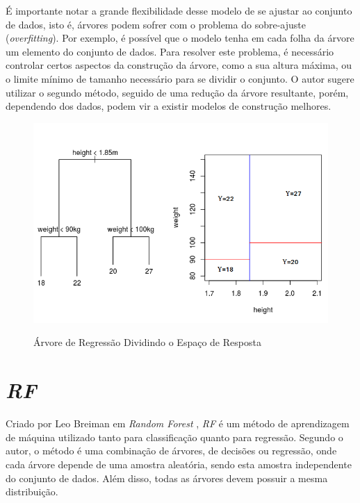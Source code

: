 É importante notar a grande flexibilidade desse modelo de se ajustar ao conjunto de dados, isto é, árvores podem sofrer com o problema do sobre-ajuste (\textit{overfitting}). Por exemplo, é possível que o modelo tenha em cada folha da árvore um elemento do conjunto de dados. Para resolver este problema, é necessário controlar certos aspectos da construção da árvore, como a sua altura máxima, ou o limite mínimo de tamanho necessário para se dividir o conjunto. O autor sugere utilizar o segundo método, seguido de uma redução da árvore resultante, porém, dependendo dos dados, podem vir a existir modelos de construção melhores.
 
 \begin{figure}[htbp]
    \centering
    \includegraphics[scale=0.6]{monography/img/models/regression_tree.png}
    \label{figure:tree}
    \caption[Árvore de Regressão Dividindo o Espaço de Resposta]{Árvore de Regressão Dividindo o Espaço de Resposta\footnotemark}
\end{figure}


\section{\textit{\acrfull{RF}}}

Criado por Leo Breiman em \textit{Random Forest} \cite{Breiman:2001:RF:570181.570182}, \textit{\acrshort{RF}} é um método de aprendizagem de máquina utilizado tanto para classificação quanto para regressão. Segundo o autor, o método é uma combinação de árvores, de decisões ou regressão, onde cada árvore depende de uma amostra aleatória, sendo esta amostra independente do conjunto de dados. Além disso, todas as árvores devem possuir a mesma distribuição. 

